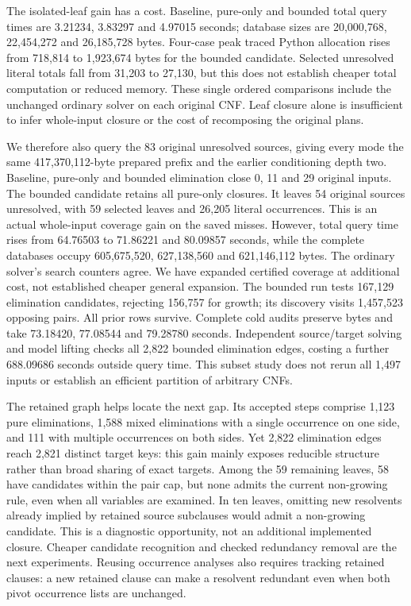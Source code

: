 \documentclass[11pt,a4paper]{article}
\numberwithin{equation}{section}
\theoremstyle{plain}
\theoremstyle{definition}
\theoremstyle{remark}
\begin{document}
The isolated-leaf gain has a cost. Baseline, pure-only and bounded total query times are 3.21234, 3.83297 and 4.97015 seconds; database sizes are 20,000,768, 22,454,272 and 26,185,728 bytes. Four-case peak traced Python allocation rises from 718,814 to 1,923,674 bytes for the bounded candidate. Selected unresolved literal totals fall from 31,203 to 27,130, but this does not establish cheaper total computation or reduced memory. These single ordered comparisons include the unchanged ordinary solver on each original CNF. Leaf closure alone is insufficient to infer whole-input closure or the cost of recomposing the original plans.

We therefore also query the 83 original unresolved sources, giving every mode the same 417,370,112-byte prepared prefix and the earlier conditioning depth two. Baseline, pure-only and bounded elimination close 0, 11 and 29 original inputs. The bounded candidate retains all pure-only closures. It leaves 54 original sources unresolved, with 59 selected leaves and 26,205 literal occurrences. This is an actual whole-input coverage gain on the saved misses. However, total query time rises from 64.76503 to 71.86221 and 80.09857 seconds, while the complete databases occupy 605,675,520, 627,138,560 and 621,146,112 bytes. The ordinary solver's search counters agree. We have expanded certified coverage at additional cost, not established cheaper general expansion. The bounded run tests 167,129 elimination candidates, rejecting 156,757 for growth; its discovery visits 1,457,523 opposing pairs. All prior rows survive. Complete cold audits preserve bytes and take 73.18420, 77.08544 and 79.28780 seconds. Independent source/target solving and model lifting checks all 2,822 bounded elimination edges, costing a further 688.09686 seconds outside query time. This subset study does not rerun all 1,497 inputs or establish an efficient partition of arbitrary CNFs.

The retained graph helps locate the next gap. Its accepted steps comprise 1,123 pure eliminations, 1,588 mixed eliminations with a single occurrence on one side, and 111 with multiple occurrences on both sides. Yet 2,822 elimination edges reach 2,821 distinct target keys: this gain mainly exposes reducible structure rather than broad sharing of exact targets. Among the 59 remaining leaves, 58 have candidates within the pair cap, but none admits the current non-growing rule, even when all variables are examined. In ten leaves, omitting new resolvents already implied by retained source subclauses would admit a non-growing candidate. This is a diagnostic opportunity, not an additional implemented closure. Cheaper candidate recognition and checked redundancy removal are the next experiments. Reusing occurrence analyses also requires tracking retained clauses: a new retained clause can make a resolvent redundant even when both pivot occurrence lists are unchanged.
\end{document}
